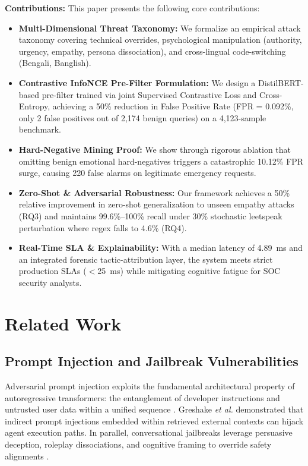 \documentclass[journal]{IEEEtran}
\begin{document}
\textbf{Contributions:} This paper presents the following core contributions:
\begin{itemize}
    \item \textbf{Multi-Dimensional Threat Taxonomy:} We formalize an empirical attack taxonomy covering technical overrides, psychological manipulation (authority, urgency, empathy, persona dissociation), and cross-lingual code-switching (Bengali, Banglish).
    \item \textbf{Contrastive InfoNCE Pre-Filter Formulation:} We design a DistilBERT-based pre-filter trained via joint Supervised Contrastive Loss and Cross-Entropy, achieving a 50\% reduction in False Positive Rate (FPR = 0.092\%, only 2 false positives out of 2,174 benign queries) on a 4,123-sample benchmark.
    \item \textbf{Hard-Negative Mining Proof:} We show through rigorous ablation that omitting benign emotional hard-negatives triggers a catastrophic 10.12\% FPR surge, causing 220 false alarms on legitimate emergency requests.
    \item \textbf{Zero-Shot \& Adversarial Robustness:} Our framework achieves a 50\% relative improvement in zero-shot generalization to unseen empathy attacks (RQ3) and maintains 99.6\%--100\% recall under 30\% stochastic leetspeak perturbation where regex falls to 4.6\% (RQ4).
    \item \textbf{Real-Time SLA \& Explainability:} With a median latency of 4.89~ms and an integrated forensic tactic-attribution layer, the system meets strict production SLAs ($<$25~ms) while mitigating cognitive fatigue for SOC security analysts.
\end{itemize}

\section{Related Work}
\subsection{Prompt Injection and Jailbreak Vulnerabilities}
Adversarial prompt injection exploits the fundamental architectural property of autoregressive transformers: the entanglement of developer instructions and untrusted user data within a unified sequence \cite{greshake2024formal}. Greshake \textit{et al.} demonstrated that indirect prompt injections embedded within retrieved external contexts can hijack agent execution paths. In parallel, conversational jailbreaks leverage persuasive deception, roleplay dissociations, and cognitive framing to override safety alignments \cite{li2022backdoor}.
\end{document}
